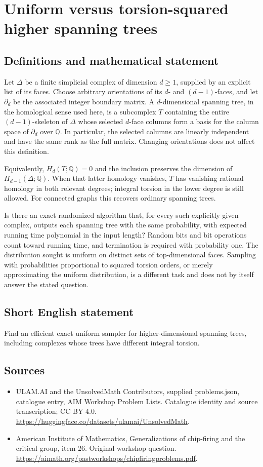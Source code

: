 \documentclass[11pt,a4paper]{article}
\begin{document}
\section*{Uniform versus torsion-squared higher spanning trees}\label{statement}

\subsection{Definitions and mathematical statement}
Let $\Delta$ be a finite simplicial complex of dimension $d\geq1$, supplied by an explicit list of its faces.
Choose arbitrary orientations of its $d$- and $(d-1)$-faces, and let $\partial_d$ be the associated integer boundary matrix.
A $d$-dimensional spanning tree, in the homological sense used here, is a subcomplex $T$ containing the entire $(d-1)$-skeleton of $\Delta$ whose selected $d$-face columns form a basis for the column space of $\partial_d$ over $\mathbb Q$.
In particular, the selected columns are linearly independent and have the same rank as the full matrix.
Changing orientations does not affect this definition.

Equivalently, $H_d(T;\mathbb Q)=0$ and the inclusion preserves the dimension of $H_{d-1}(\Delta;\mathbb Q)$.
When that latter homology vanishes, $T$ has vanishing rational homology in both relevant degrees; integral torsion in the lower degree is still allowed.
For connected graphs this recovers ordinary spanning trees.

Is there an exact randomized algorithm that, for every such explicitly given complex, outputs each spanning tree with the same probability, with expected running time polynomial in the input length?
Random bits and bit operations count toward running time, and termination is required with probability one.
The distribution sought is uniform on distinct sets of top-dimensional faces.
Sampling with probabilities proportional to squared torsion orders, or merely approximating the uniform distribution, is a different task and does not by itself answer the stated question.
\subsection{Short English statement}
Find an efficient exact uniform sampler for higher-dimensional spanning trees, including complexes whose trees have different integral torsion.
\subsection{Sources}
\begin{itemize}
\item[S1] ULAM.AI and the UnsolvedMath Contributors, supplied problems.json, catalogue entry, AIM Workshop Problem Lists. Catalogue identity and source transcription; CC BY 4.0.
\url{https://huggingface.co/datasets/ulamai/UnsolvedMath}.
\item[S2] American Institute of Mathematics, Generalizations of chip-firing and the critical group, item 26. Original workshop question.
\url{https://aimath.org/pastworkshops/chipfiringproblems.pdf}.
\end{itemize}
\end{document}
